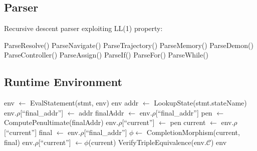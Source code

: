 \documentclass[twocolumn,10pt]{article}
\theoremstyle{definition}
\theoremstyle{remark}
\begin{document}
\subsection{Parser}

Recursive descent parser exploiting LL(1) property:

\begin{algorithm}
\caption{vaHera Parser}
\begin{algorithmic}[1]
            \State \Return ParseResolve()
        \EndCase
            \State \Return ParseNavigate()
        \EndCase
            \State \Return ParseTrajectory()
        \EndCase
            \State \Return ParseMemory()
        \EndCase
            \State \Return ParseDemon()
        \EndCase
            \State \Return ParseController()
        \EndCase
            \State \Return ParseAssign()
        \EndCase
            \State \Return ParseIf()
        \EndCase
            \State \Return ParseFor()
        \EndCase
            \State \Return ParseWhile()
        \EndCase
    \EndSwitch
\EndFunction
\end{algorithmic}
\end{algorithm}

\subsection{Runtime Environment}

\begin{algorithm}
\caption{vaHera Runtime Evaluation}
\begin{algorithmic}[1]
        \State env $\gets$ EvalStatement(stmt, env)
    \EndFor
    \State \Return env
\EndFunction
\Statex
{}
            \State addr $\gets$ LookupState(stmt.stateName)
            \State env.$\rho$[``final\_addr''] $\gets$ addr
        \EndCase
                \State finalAddr $\gets$ env.$\rho$[``final\_addr'']
                \State pen $\gets$ ComputePenultimate(finalAddr)
                \State env.$\rho$[``current''] $\gets$ pen
            \EndIf
        \EndCase
                \State current $\gets$ env.$\rho$[``current'']
                \State final $\gets$ env.$\rho$[``final\_addr'']
                \State $\phi \gets$ CompletionMorphism(current, final)
                \State env.$\rho$[``current''] $\gets \phi$(current)
            \EndIf
        \EndCase
                \State VerifyTripleEquivalence(env.$\mathcal{C}$)
            \EndIf
        \EndCase
    \EndSwitch
    \State \Return env
\EndFunction
\end{algorithmic}
\end{algorithm}
\end{document}

